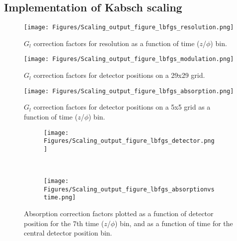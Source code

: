 \documentclass[11pt, oneside]{article}   	%
\begin{document}
\subsection{Implementation of Kabsch scaling}

\begin{figure}[t!] %
   \centering
   \texttt{[image: Figures/Scaling\_output\_figure\_lbfgs\_resolution.png]} 
   \caption{$G_l$ correction factors for resolution as a function of time ($z$/$\phi$) bin.}
   \label{fig:resolution}
\end{figure}

\begin{figure}[t] %
   \centering
   \texttt{[image: Figures/Scaling\_output\_figure\_lbfgs\_modulation.png]} 
   \caption{$G_l$ correction factors for detector positions on a 29x29 grid.}
   \label{fig:modulation}
\end{figure}

\begin{figure}[t] %
   \centering
   \texttt{[image: Figures/Scaling\_output\_figure\_lbfgs\_absorption.png]} 
   \caption{$G_l$ correction factors for detector positions on a 5x5 grid as a function of time ($z$/$\phi$) bin.}
   \label{fig:absorption}
\end{figure}

\begin{figure}[t!]
    \centering
    \begin{subfigure}[t]{0.5\textwidth}
        \centering
        \texttt{[image: Figures/Scaling\_output\_figure\_lbfgs\_detector.png]}
    \end{subfigure}%
    ~ 
    \begin{subfigure}[t]{0.5\textwidth}
        \centering
        \texttt{[image: Figures/Scaling\_output\_figure\_lbfgs\_absorptionvstime.png]}
    \end{subfigure}
    \caption{Absorption correction factors plotted as a function of detector position for the 7th time ($z$/$\phi$) bin, and as a function of time for the central detector position bin.}
    \label{fig:abs}
\end{figure}
\end{document}
